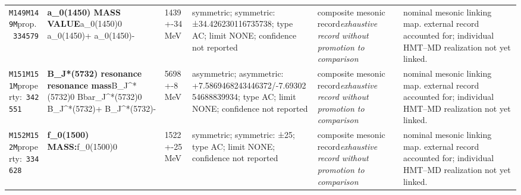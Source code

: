 \begin{landscape}
\begin{longtable}{L{1.85cm}L{4.45cm}L{2.35cm}L{4.05cm}L{3.35cm}L{7.15cm}}
\texttt{M149}\newline \texttt{M149M}\newline prop.\ \texttt{334579} & \textbf{a\_\allowbreak{}0(1450) MASS VALUE}\newline a\_\allowbreak{}0(1450)0 \textbar{}\allowbreak{} a\_\allowbreak{}0(1450)+ \textbar{}\allowbreak{} a\_\allowbreak{}0(1450)- & 1439+-34\,MeV & symmetric; symmetric: ±34.426230116735738; type AC; limit NONE; confidence not reported & composite mesonic record\newline \emph{exhaustive record without promotion to comparison} & nominal mesonic linking map. external record accounted for; individual HMT--MD realization not yet linked. \\
\texttt{M151}\newline \texttt{M151M}\newline property:\ \texttt{342551} & \textbf{B\_\allowbreak{}J*(5732) resonance resonance mass}\newline B\_\allowbreak{}J\textasciicircum{}*(5732)0 \textbar{}\allowbreak{} Bbar\_\allowbreak{}J\textasciicircum{}*(5732)0 \textbar{}\allowbreak{} B\_\allowbreak{}J\textasciicircum{}*(5732)+ \textbar{}\allowbreak{} B\_\allowbreak{}J\textasciicircum{}*(5732)- & 5698+-8\,MeV & asymmetric; asymmetric: +7.5869468243446372/-7.6930254688839934; type AC; limit NONE; confidence not reported & composite mesonic record\newline \emph{exhaustive record without promotion to comparison} & nominal mesonic linking map. external record accounted for; individual HMT--MD realization not yet linked. \\
\texttt{M152}\newline \texttt{M152M}\newline property:\ \texttt{334628} & \textbf{f\_\allowbreak{}0(1500) MASS:}\newline f\_\allowbreak{}0(1500)0 & 1522+-25\,MeV & symmetric; symmetric: ±25; type AC; limit NONE; confidence not reported & composite mesonic record\newline \emph{exhaustive record without promotion to comparison} & nominal mesonic linking map. external record accounted for; individual HMT--MD realization not yet linked. \\

\end{longtable}
\end{landscape}
